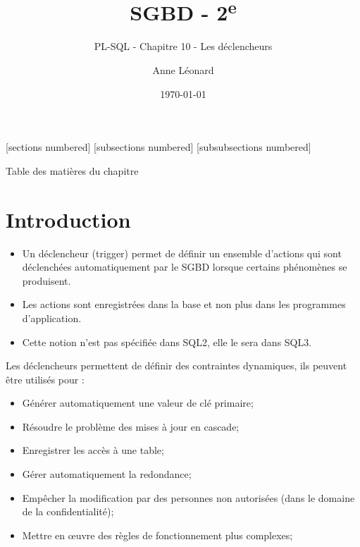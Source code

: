 \documentclass[10pt]{beamer}
\title{SGBD - 2\textsuperscript{e}}
\subtitle{PL-SQL - Chapitre 10 - Les déclencheurs}
\date{\today}
\author{Anne Léonard}
\institute{Haute École de la Province de Liège}
\begin{document}
\maketitle

[sections numbered]
[subsections numbered]
[subsubsections numbered]
\begin{frame}[allowframebreaks]{Table des matières du chapitre}
    \tableofcontents[subsectionstyle=show/show/hide,subsubsectionstyle=show/show/hide,]
\end{frame}

\section{Introduction}
\begin{frame}{\secname}
    \begin{itemize}
        \item Un déclencheur (trigger) permet de définir un ensemble d'actions qui sont déclenchées automatiquement par le SGBD lorsque certains phénomènes se produisent.
        \item Les actions sont enregistrées dans la base et non plus dans les programmes d'application.
        \item Cette notion n'est pas spécifiée dans SQL2, elle le sera dans SQL3.
    \end{itemize}
\end{frame}

\begin{frame}{\secname}
    Les déclencheurs permettent de définir des contraintes dynamiques, ils peuvent être utilisés pour :
    \begin{itemize}
        \item Générer automatiquement une valeur de clé primaire;
        \item Résoudre le problème des mises à jour en cascade;
        \item Enregistrer les accès à une table;
        \item Gérer automatiquement la redondance;
        \item Empêcher la modification par des personnes non autorisées (dans le domaine de la confidentialité);
        \item Mettre en œuvre des règles de fonctionnement plus complexes;
    \end{itemize}
\end{frame}
\end{document}
